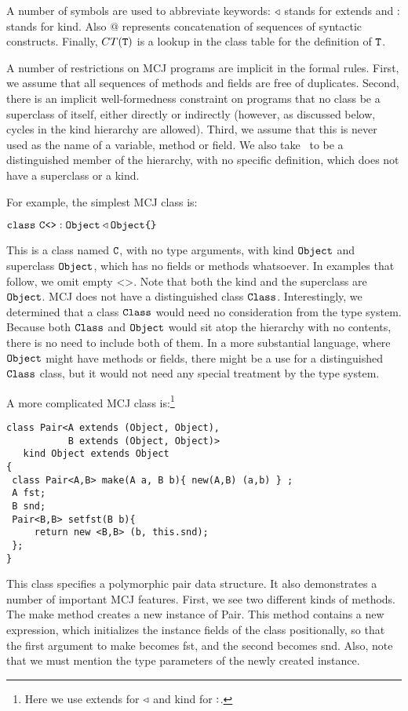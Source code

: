 \documentclass{acm-sigplan}
\begin{document}
A number of symbols are used to abbreviate keywords: $\triangleleft$
stands for {\txt extends} and $:$ stands for {\txt kind}. Also
$@$ represents concatenation of sequences of syntactic constructs.
Finally, $CT(\mbox {\tt T})$ is a lookup in the class table for the definition of
$\mbox {\tt T}$.

A number of restrictions on MCJ programs are implicit in the formal
rules.  First, we assume that all sequences of methods and fields are
free of duplicates.  Second, there is an implicit well-formedness
constraint on programs that no class be a superclass of itself, either
directly or indirectly (however, as discussed below, cycles in the
kind hierarchy are allowed).  Third, we assume that {\txt this} is
never used as the name of a variable, method or field.  We also take
\Object\ to be a distinguished member of the hierarchy, with no
specific definition, which does not have a superclass or a kind.

For example, the simplest MCJ class is:

\vspace{.1cm}
$\mbox{\tt class}\ {\mbox {\tt C}}\mbox{\tt <}\mbox{\tt >} : \mbox{\tt Object} \triangleleft \mbox{\tt Object} \mbox{\tt \{}\mbox{\tt \}}$
\vspace{.1cm}

This is a class named $\mbox {\tt C}$, with no type arguments, with kind
$\mbox{\tt Object}$ and superclass $\mbox{\tt Object}$, which has no fields or methods
whatsoever.  In examples that follow, we omit empty {\txt <>}.  Note
that both the kind and the superclass are $\mbox{\tt Object}$.  MCJ does not
have a distinguished class $\mbox{\tt Class}$.  Interestingly, we determined
that a class $\mbox{\tt Class}$ would need no consideration from the type
system.  Because both $\mbox{\tt Class}$ and $\mbox{\tt Object}$ would sit atop the
hierarchy with no contents, there is no need to include
both of them.  In a more substantial language, where $\mbox{\tt Object}$ might
have methods or fields, there might be a use for a distinguished
$\mbox{\tt Class}$ class, but it would not need any special treatment by
the type system.

A more complicated MCJ class is:\footnote{Here we use {\txt extends}
for $\triangleleft$ and {\txt kind} for $:$.}

\begin{verbatim}
class Pair<A extends (Object, Object),
           B extends (Object, Object)>
   kind Object extends Object
{
 class Pair<A,B> make(A a, B b){ new(A,B) (a,b) } ;
 A fst;
 B snd;
 Pair<B,B> setfst(B b){
     return new <B,B> (b, this.snd);
 };
}
\end{verbatim}

This class specifies a polymorphic pair data structure.  It also
demonstrates a number of important MCJ features.  First, we see two
different kinds of methods.  The {\txt make} method creates a new
instance of {\txt Pair}.  This method contains a {\txt new}
expression, which initializes the instance fields of the class
positionally, so that the first argument to {\txt make} becomes {\txt
 fst}, and the second becomes {\txt snd}.  Also, note that we must
mention the type parameters of the newly created instance.
\end{document}
